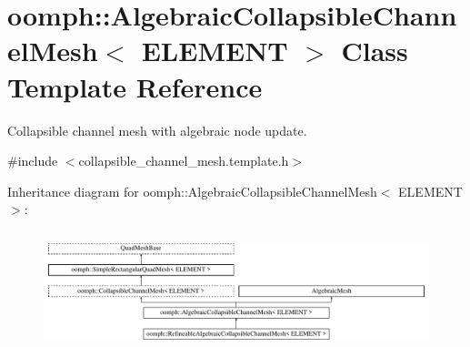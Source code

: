 \hypertarget{classoomph_1_1AlgebraicCollapsibleChannelMesh}{}\section{oomph\+:\+:Algebraic\+Collapsible\+Channel\+Mesh$<$ E\+L\+E\+M\+E\+NT $>$ Class Template Reference}
\label{classoomph_1_1AlgebraicCollapsibleChannelMesh}


Collapsible channel mesh with algebraic node update.  




{\ttfamily \#include $<$collapsible\+\_\+channel\+\_\+mesh.\+template.\+h$>$}

Inheritance diagram for oomph\+:\+:Algebraic\+Collapsible\+Channel\+Mesh$<$ E\+L\+E\+M\+E\+NT $>$\+:\begin{figure}[H]
\begin{center}
\leavevmode
\includegraphics[height=3.500000cm]{classoomph_1_1AlgebraicCollapsibleChannelMesh}
\end{center}
\end{figure}
